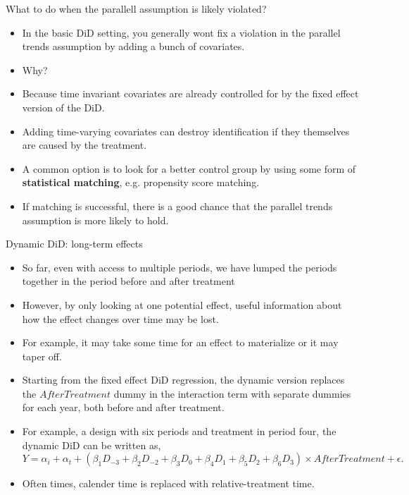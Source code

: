 \documentclass[notes,11pt, aspectratio=169]{beamer}
\begin{document}
\begin{frame}{What to do when the parallell assumption is likely violated?}
   \begin{itemize}
       \item In the basic DiD setting, you generally wont fix a violation in the parallel trends assumption by adding a bunch of covariates.
       \item Why?
       \item Because time invariant covariates are already controlled for by the fixed effect version of the DiD.
       \item Adding time-varying covariates can destroy identification if they themselves are caused by the treatment.
       \item A common option is to look for a better control group by using some form of \textbf{statistical matching}, e.g. propensity score matching.
       \item If matching is successful, there is a good chance that the parallel trends assumption is more likely to hold.
   \end{itemize}
\end{frame}

\begin{frame}{Dynamic DiD: long-term effects}
    \begin{itemize}
        \item So far, even with access to multiple periods, we have lumped the periods together in the period before and after treatment
        \item However, by only looking at one potential effect, useful information about how the effect changes over time may be lost.
        \item For example, it may take some time for an effect to materialize or it may taper off. 
        \item Starting from the fixed effect DiD regression, the dynamic version replaces the $AfterTreatment$ dummy in the interaction term with separate dummies for each year, both before and after treatment. 
        \item For example, a design with six periods and treatment in period four, the dynamic DiD can be written as,
        \begin{equation}
            Y = \alpha_i + \alpha_{t} + \left(\beta_{1}D_{-3}+\beta_{2} D_{-2} +\beta_{3} D_{0} + \beta_{4} D_{1}+ \beta_{5} D_{2} + \beta_{6} D_{3} \right) \times AfterTreatment + \epsilon.
        \end{equation}
        \item Often times, calender time is replaced with relative-treatment time.
    \end{itemize}
\end{frame}
\end{document}
